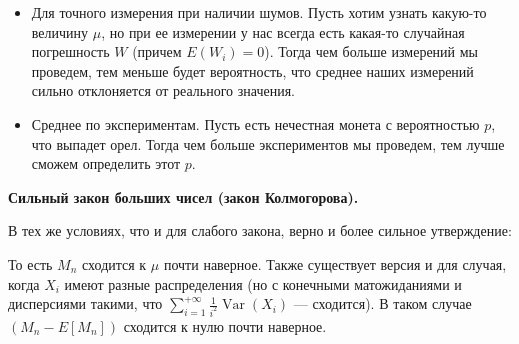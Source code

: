 \documentclass[12pt]{article}
\DeclareMathOperator{\Var}{Var}
\begin{document}
\begin{itemize}
  \item Для точного измерения при наличии шумов. Пусть хотим узнать какую-то величину $\mu$, но при ее измерении у нас всегда есть какая-то случайная погрешность $W$ (причем $E(W_i) = 0$). Тогда чем больше измерений мы проведем, тем меньше будет вероятность, что среднее наших измерений сильно отклоняется от реального значения.
  \item Среднее по экспериментам. Пусть есть нечестная монета с вероятностью $p$, что выпадет орел. Тогда чем больше экспериментов мы проведем, тем лучше сможем определить этот $p$. 
\end{itemize}

\textbf{Сильный закон больших чисел (закон Колмогорова).}

В тех же условиях, что и для слабого закона, верно и более сильное утверждение:
\begin{center}
\end{center}
То есть $M_n$ сходится к $\mu$ почти наверное. Также существует версия и для случая, когда $X_i$ имеют разные распределения (но с конечными матожиданиями и дисперсиями такими, что $\sum_{i = 1}^{+\infty} \frac{1}{i^2} \Var(X_i)$ --- сходится). В таком случае $(M_n - E[M_n])$ сходится к нулю почти наверное.
\end{document}
